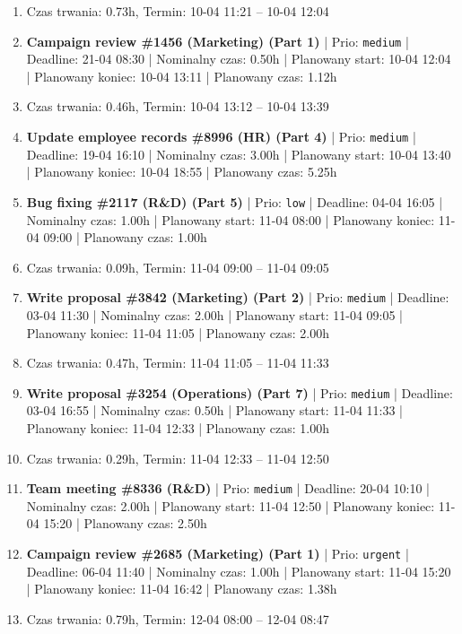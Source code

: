 {\begin{enumerate}
  \item [\textbf{PRZERWA}] Czas trwania: 0.73h, Termin: 10-04 11:21 -- 10-04 12:04
  \item [\textbf{14653}] \textbf{Campaign review \#1456 (Marketing) (Part 1)} | Prio: \texttt{medium} | Deadline: 21-04 08:30 | Nominalny czas: 0.50h | Planowany start: 10-04 12:04 | Planowany koniec: 10-04 13:11 | Planowany czas: 1.12h
  \item [\textbf{PRZERWA}] Czas trwania: 0.46h, Termin: 10-04 13:12 -- 10-04 13:39
  \item [\textbf{14655}] \textbf{Update employee records \#8996 (HR) (Part 4)} | Prio: \texttt{medium} | Deadline: 19-04 16:10 | Nominalny czas: 3.00h | Planowany start: 10-04 13:40 | Planowany koniec: 10-04 18:55 | Planowany czas: 5.25h
  \item [\textbf{14689}] \textbf{Bug fixing \#2117 (R\&D) (Part 5)} | Prio: \texttt{low} | Deadline: 04-04 16:05 | Nominalny czas: 1.00h | Planowany start: 11-04 08:00 | Planowany koniec: 11-04 09:00 | Planowany czas: 1.00h
  \item [\textbf{PRZERWA}] Czas trwania: 0.09h, Termin: 11-04 09:00 -- 11-04 09:05
  \item [\textbf{14673}] \textbf{Write proposal \#3842 (Marketing) (Part 2)} | Prio: \texttt{medium} | Deadline: 03-04 11:30 | Nominalny czas: 2.00h | Planowany start: 11-04 09:05 | Planowany koniec: 11-04 11:05 | Planowany czas: 2.00h
  \item [\textbf{PRZERWA}] Czas trwania: 0.47h, Termin: 11-04 11:05 -- 11-04 11:33
  \item [\textbf{14663}] \textbf{Write proposal \#3254 (Operations) (Part 7)} | Prio: \texttt{medium} | Deadline: 03-04 16:55 | Nominalny czas: 0.50h | Planowany start: 11-04 11:33 | Planowany koniec: 11-04 12:33 | Planowany czas: 1.00h
  \item [\textbf{PRZERWA}] Czas trwania: 0.29h, Termin: 11-04 12:33 -- 11-04 12:50
  \item [\textbf{14649}] \textbf{Team meeting \#8336 (R\&D)} | Prio: \texttt{medium} | Deadline: 20-04 10:10 | Nominalny czas: 2.00h | Planowany start: 11-04 12:50 | Planowany koniec: 11-04 15:20 | Planowany czas: 2.50h
  \item [\textbf{14607}] \textbf{Campaign review \#2685 (Marketing) (Part 1)} | Prio: \texttt{urgent} | Deadline: 06-04 11:40 | Nominalny czas: 1.00h | Planowany start: 11-04 15:20 | Planowany koniec: 11-04 16:42 | Planowany czas: 1.38h
  \item [\textbf{PRZERWA}] Czas trwania: 0.79h, Termin: 12-04 08:00 -- 12-04 08:47

\end{enumerate}}
